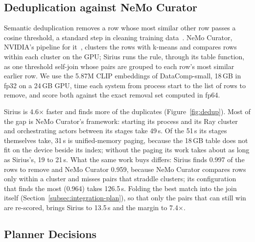 \subsection{Deduplication against NeMo Curator}\label{subsec:eval-selfjoin}



Semantic deduplication removes a row whose most similar other row passes a cosine threshold, a standard step in cleaning training data~\cite{AbbasSemDeDup23}.
NeMo Curator, NVIDIA's pipeline for it~\cite{NeMoCurator}, clusters the rows with k-means and compares rows within each cluster on the GPU; Sirius runs the rule, through its table function, as one threshold self-join whose pairs are grouped to each row's most similar earlier row.
We use the 5.87M CLIP embeddings of DataComp-small, 18\,GB in fp32 on a 24\,GB GPU, time each system from process start to the list of rows to remove, and score both against the exact removal set computed in fp64.

Sirius is 4.6$\times$ faster and finds more of the duplicates (Figure~\ref{fig:dedup}).
Most of the gap is NeMo Curator's framework: starting its process and its Ray cluster and orchestrating actors between its stages take 49\,s.
Of the 51\,s its stages themselves take, 31\,s is unified-memory paging, because the 18\,GB table does not fit on the device beside its index; without the paging its work takes about as long as Sirius's, 19 to 21\,s.
What the same work buys differs: Sirius finds 0.997 of the rows to remove and NeMo Curator 0.959, because NeMo Curator compares rows only within a cluster and misses pairs that straddle clusters; its configuration that finds the most (0.964) takes 126.5\,s.
Folding the best match into the join itself (Section~\ref{subsec:integration-plan}), so that only the pairs that can still win are re-scored, brings Sirius to 13.5\,s and the margin to 7.4$\times$.

\subsection{Planner Decisions}\label{subsec:eval-planner}



